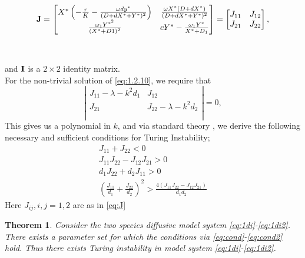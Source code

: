 \documentclass[10pt]{amsart}
\newtheorem{theorem}{Theorem}[section]
\theoremstyle{definition}
\begin{document}
\begin{equation}
\label{eq:J}
 \bf{J}= \begin{bmatrix}
     X^{*}\left(-\frac{r}{K}-\frac{\omega d y^{*}}{(D+dX^{*}+Y^{*})^2}\right)&   \frac{\omega X^*(D+dX^*)}{(D+dX^{*}+Y^{*})^2}  \\
         \frac{\omega_1Y^{*^{2}}}{(X^*+D1)^2}& cY^*-\frac{\omega_1Y^*}{X^*+D_1}    \\
            \end{bmatrix}
      =\begin{bmatrix}
       J_{11} & J_{12} \\
       J_{21} & J_{22} \\
        \end{bmatrix},
        \end{equation}
    \\
\\and $\bf{I}$ is a $2\times 2$ identity matrix.\\
For the non-trivial solution of \eqref{eq:1.2.10}, we require that
\[
\left|
\begin{array}{cc}
J_{11}-\lambda -k^2d_1 & J_{12}                         \\
       J_{21}                     & J_{22}-\lambda -k^2d_2 \\
      \\
 \end{array} \right|=0,
\]
This gives us a polynomial in $k$, and via standard theory \cite{M93}, we derive the following necessary and sufficient conditions for Turing Instability;
\begin{eqnarray}
\label{eq:cond}
J_{11}+J_{22}<0\\
J_{11}J_{22}-J_{12}J_{21}>0\\
d_{1}J_{22}+d_{2}J_{11}>0\\
(\frac{J_{11}}{d_1}+\frac{J_{22}}{d_2})^2>\frac{4(J_{11}J_{22}-J_{12}J_{21}) }{d_{1}d_{2}} \label{eq:cond2}
\end{eqnarray}
Here $J_{ij}, i,j=1,2$ are as in \eqref{eq:J}
\begin{theorem}
\label{thm:tur}
Consider the two species diffusive model system \eqref{eq:1di}-\eqref{eq:1di2}. There exists a parameter set for which the conditions via \eqref{eq:cond}-\eqref{eq:cond2} hold. Thus there exists Turing instability in model system  \eqref{eq:1di}-\eqref{eq:1di2}.
\end{theorem}
\end{document}
